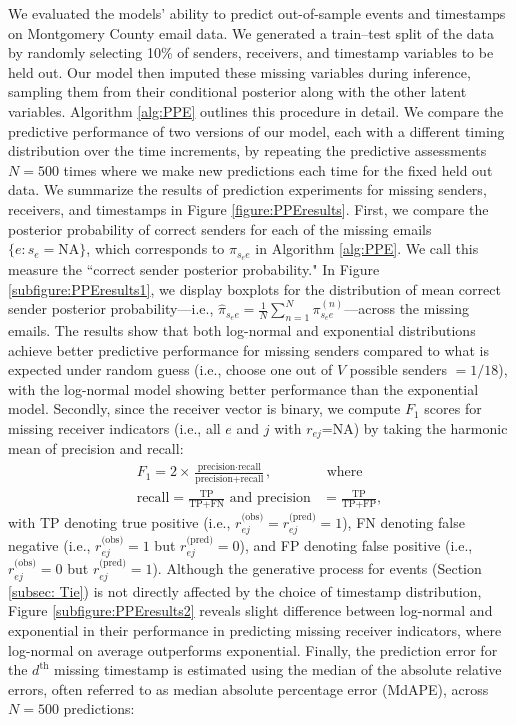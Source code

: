 \documentclass[ba]{imsart}
\numberwithin{equation}{section}
\theoremstyle{plain}
\begin{document}
	We evaluated the models' ability to predict out-of-sample events and timestamps on Montgomery County email data. We generated a train--test split of the data by randomly selecting 10\% of senders, receivers, and timestamp variables to be held out. Our model then imputed these missing variables during inference, sampling them from their conditional posterior along with the other latent variables. Algorithm \ref{alg:PPE} outlines this procedure in detail. We compare the predictive performance of two versions of our model, each with a different timing distribution over the time increments, by repeating the predictive assessments$N=500$ times where we make new predictions each time for the fixed held out data. We summarize the results of prediction experiments for missing senders, receivers, and timestamps in Figure \ref{figure:PPEresults}. First, we compare the posterior probability of correct senders for each of the missing emails $\{e:s_e=\mbox{NA}\}$, which corresponds to $\pi_{s_ee}$ in Algorithm \ref{alg:PPE}. We call this measure the ``correct sender posterior probability." In Figure \ref{subfigure:PPEresults1}, we display boxplots for the distribution of mean correct sender posterior probability---i.e., $\hat{\pi}_{s_{e}e} = \frac{1}{N}\sum_{n=1}^N \pi^{(n)}_{s_{e}e}$---across the missing emails. The results show that both log-normal and exponential distributions achieve better predictive performance for missing senders compared to what is expected under random guess (i.e., choose one out of $V$ possible senders $=1/18$), with the log-normal model showing better performance than the exponential model. Secondly, since the receiver vector is binary, we compute $F_1$ scores for missing receiver indicators (i.e., all $e$ and $j$ with $r_{ej}$=NA) by taking the harmonic mean of precision and recall:
	\begin{equation}
		\begin{aligned}
			F_1 =2\times\frac{\mbox{precision}\cdot \mbox{recall}}{\mbox{precision}+ \mbox{recall}}, &\mbox{ where } \\
			\mbox{recall}  = \frac{\mbox{TP}}{\mbox{TP+FN}} \mbox{ and } \mbox{precision} & =\frac{\mbox{TP}}{\mbox{TP+FP}},
		\end{aligned}
	\end{equation}
with TP denoting true positive (i.e., ${r}^{\textrm{(obs)}}_{ej}=r^{\textrm{(pred)}}_{ej}=1$), FN denoting false negative (i.e., ${r}^{\textrm{(obs)}}_{ej}=1$ but ${r}^{\textrm{(pred)}}_{ej}=0$), and FP denoting false positive (i.e., ${r}^{\textrm{(obs)}}_{ej}=0$ but ${r}^{\textrm{(pred)}}_{ej}=1$). Although the generative process for events (Section \ref{subsec: Tie}) is not directly affected by the choice of timestamp distribution, Figure \ref{subfigure:PPEresults2} reveals slight difference between log-normal and exponential in their performance in predicting missing receiver indicators, where log-normal on average outperforms exponential. Finally, the prediction error for the $d^{\textrm{th}}$ missing timestamp is estimated using the median of the absolute relative errors, often referred to as median absolute percentage error (MdAPE), across $N=500$ predictions:
\end{document}
